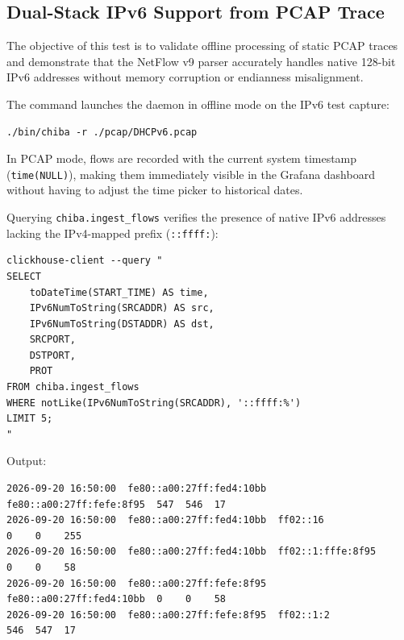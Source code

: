 \documentclass[11pt,a4paper]{article}
\newenvironment{codebox}[1][]{%
    \begin{tcolorbox}[
        colback=codebg,
        colframe=codeframe,
        boxrule=0.6pt,
        arc=1.5mm,
        left=3mm,
        right=3mm,
        top=2mm,
        bottom=2mm,
        fonttitle=\sffamily\bfseries\footnotesize,
        coltitle=chibadark,
        colbacktitle=codeframe!50!white,
        #1
    ]
}{%
    \end{tcolorbox}
}
\begin{document}
\subsection{Dual-Stack IPv6 Support from PCAP Trace}
The objective of this test is to validate offline processing of static PCAP traces and demonstrate that the NetFlow v9 parser accurately handles native 128-bit IPv6 addresses without memory corruption or endianness misalignment.

The command launches the daemon in offline mode on the IPv6 test capture:
\begin{codebox}[title={Offline IPv6 PCAP Ingestion}]
\footnotesize
\begin{verbatim}
./bin/chiba -r ./pcap/DHCPv6.pcap
\end{verbatim}
\end{codebox}

In PCAP mode, flows are recorded with the current system timestamp (\texttt{time(NULL)}), making them immediately visible in the Grafana dashboard without having to adjust the time picker to historical dates.

Querying \texttt{chiba.ingest\_flows} verifies the presence of native IPv6 addresses lacking the IPv4-mapped prefix (\texttt{::ffff:}):
\begin{codebox}[title={ClickHouse Native IPv6 Verification Query}]
\footnotesize
\begin{verbatim}
clickhouse-client --query "
SELECT
    toDateTime(START_TIME) AS time,
    IPv6NumToString(SRCADDR) AS src,
    IPv6NumToString(DSTADDR) AS dst,
    SRCPORT,
    DSTPORT,
    PROT
FROM chiba.ingest_flows
WHERE notLike(IPv6NumToString(SRCADDR), '::ffff:%')
LIMIT 5;
"
\end{verbatim}
\end{codebox}

Output:
\begin{codebox}
\footnotesize
\begin{verbatim}
2026-09-20 16:50:00  fe80::a00:27ff:fed4:10bb  fe80::a00:27ff:fefe:8f95  547  546  17
2026-09-20 16:50:00  fe80::a00:27ff:fed4:10bb  ff02::16                  0    0    255
2026-09-20 16:50:00  fe80::a00:27ff:fed4:10bb  ff02::1:fffe:8f95         0    0    58
2026-09-20 16:50:00  fe80::a00:27ff:fefe:8f95  fe80::a00:27ff:fed4:10bb  0    0    58
2026-09-20 16:50:00  fe80::a00:27ff:fefe:8f95  ff02::1:2                 546  547  17
\end{verbatim}
\end{codebox}
\end{document}
